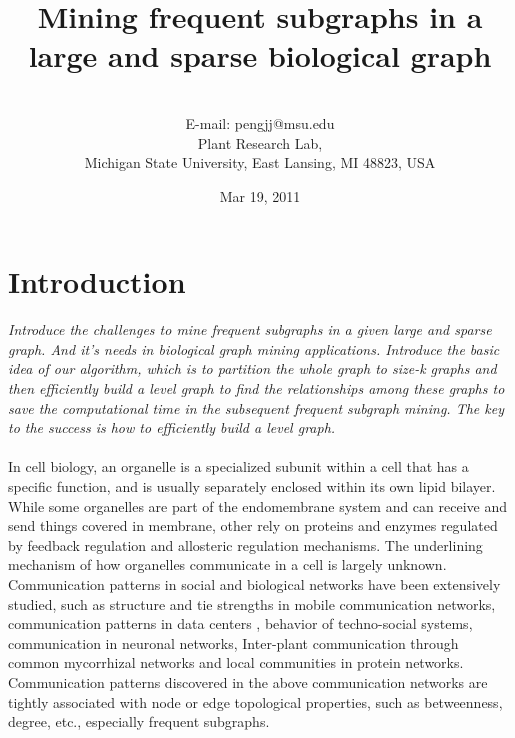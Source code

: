 \documentclass[9pt,oneside]{article}
\begin{document}
\title{\LARGE \bf Mining frequent subgraphs in a large and sparse biological graph}

\date{Mar 19, 2011}
\author{%
\\
{ \small E-mail: pengjj@msu.edu }  \\
        {\small Plant Research  Lab,}\\
        {\small Michigan State University,
       East Lansing, MI 48823, USA }\\
        }
\maketitle
\Large
\section{Introduction}

{\it Introduce the challenges to mine frequent subgraphs in a given large and sparse graph. And it's needs in biological graph mining applications. Introduce the basic idea of our algorithm, which is to partition the whole graph to size-k graphs and then efficiently build a level graph to find the relationships among these graphs to save the computational time in the subsequent frequent subgraph mining. The key to the success is how to efficiently build a level graph.}\\\\
%
In cell biology, an organelle is a specialized subunit within a cell that has a specific function, and is usually separately enclosed within its own lipid bilayer. While some organelles are part of the endomembrane system and can receive and send things covered in membrane, other rely on proteins and enzymes regulated by feedback regulation and allosteric regulation mechanisms. The underlining mechanism of how organelles communicate in a cell is largely unknown. 
%
Communication patterns in social and biological networks have been extensively studied, such as structure and tie strengths in mobile communication networks\cite{onnela2007structure}, communication patterns in data centers
\cite{natu2011mining}, behavior of techno-social systems\cite{vespignani2009predicting}, communication in neuronal networks\cite{laughlin2003communication}, Inter-plant communication through common mycorrhizal networks\cite{song2010interplant} and local communities in protein networks\cite{voevodski2009finding}.
%
Communication patterns discovered in the above communication networks are tightly associated with node or edge topological properties, such as betweenness, degree, etc., especially frequent subgraphs.
%
\end{document}
